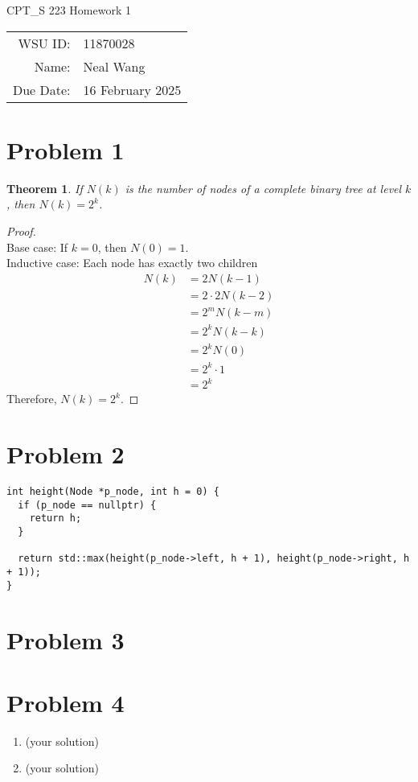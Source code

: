 \documentclass[12pt]{article}
\newtheorem{thm}{Theorem}
\begin{document}
\begin{center}
  {\Large CPT\_S 223 Homework 1}
  $ $\\
  $ $\\
  \begin{tabular}{rl}
    WSU ID: & 11870028 \\
    Name: & Neal Wang \\
    Due Date: & 16 February 2025
  \end{tabular}
\end{center}

\section*{Problem 1}

\begin{thm}
  If $N(k)$ is the number of nodes of a complete binary tree at level
  $k$, then $N(k) = 2^k$.
\end{thm}

\begin{proof}
  $ $\\
  Base case: If $k = 0$, then $N(0) = 1$. \\
  Inductive case: Each node has exactly two children
  \begin{align*}
    N(k) & = 2N(k - 1) \\
    & = 2 \cdot 2N(k - 2) \\
    & = 2^mN(k - m) \\
    & = 2^kN(k - k) \\
    & = 2^kN(0) \\
    & = 2^k \cdot 1 \\
    & = 2^k
  \end{align*}
  Therefore, $N(k) = 2^k$.
\end{proof}

\section*{Problem 2}

\begin{verbatim}
int height(Node *p_node, int h = 0) {
  if (p_node == nullptr) {
    return h;
  }

  return std::max(height(p_node->left, h + 1), height(p_node->right, h + 1));
}
\end{verbatim}

\section*{Problem 3}

\section*{Problem 4}

\begin{enumerate}[label=(\alph*)]
  \item (your solution)
  \item (your solution)
\end{enumerate}
\end{document}
